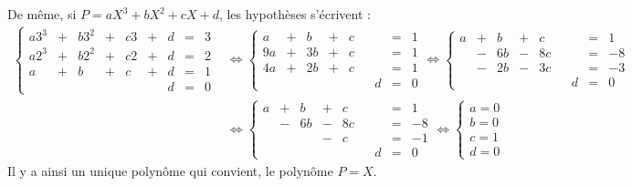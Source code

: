 {{De même, si $P=aX^3+bX^2+cX+d$, les hypothèses s'écrivent :
\begin{align*}
  \left\{\begin{array}{rcrcrcrcl} a3^3 & + & b3^2 & + & c3 & + & d & = & 3 \\ a2^3 & + & b2^2 & + & c2 & + & d & = & 2 \\ a & + & b & + & c & + & d & = & 1 \\  &  &  &  &  &  & d & = & 0 \end{array}\right. &\iff \left\{\begin{array}{rcrcrcrcl} a & + & b & + & c &  &  & = & 1 \\ 9a & + & 3b & + & c &  &  & = & 1 \\ 4a & + & 2b & + & c &  &  & = & 1 \\  &  &  &  &  &  & d & = & 0 \end{array}\right.
  \iff \left\{\begin{array}{rcrcrcrcl} a & + & b & + & c &  &  & = & 1 \\  & - & 6b & - & 8c &  &  & = & -8 \\  & - & 2b & - & 3c &  &  & = & -3 \\  &  &  &  &  &  & d & = & 0 \end{array}\right.\\
  &\iff \left\{\begin{array}{rcrcrcrcl} a & + & b & + & c &  &  & = & 1 \\  & - & 6b & - & 8c &  &  & = & -8 \\  &  &  & - & c &  &  & = & -1 \\  &  &  &  &  &  & d & = & 0 \end{array}\right. \iff \begin{cases} a=0 \\ b=0 \\ c=1 \\ d=0 \end{cases}
\end{align*}
Il y a ainsi un unique polynôme qui convient, le polynôme $P=X$.}
}

